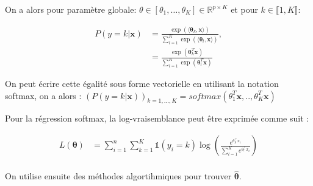 \documentclass{article}
\begin{document}
On a alors pour paramètre globale: \(\theta \in [\theta_1, \ldots, \theta_K] \in \mathbb{R}^{p\times K}\) et pour \(k \in \llbracket 1, K \rrbracket\):

\begin{align*}
    P(y=k | \bm{x}) &= \frac{\exp(\langle \boldsymbol{\theta}_k, \bm{x} \rangle)}{\sum_{l=1}^{K} \exp(\langle \boldsymbol{\theta}_l, \bm{x} \rangle)}, \\
    &= \frac{\exp(\boldsymbol{\theta}_k^T \bm{x})}{\sum_{l=1}^{K} \exp(\boldsymbol{\theta}_l^T \bm{x})}
\end{align*}


On peut écrire cette égalité sous forme vectorielle en utilisant la notation softmax, on a alors :
$(P(y=k | \bm{x}))_{k=1,...,K}=softmax(\theta_1^T\bm{x},..,\theta_K^T\bm{x})$

Pour la régression softmax, la log-vraisemblance peut être exprimée comme suit :

\begin{align*}
L(\bm{\theta}) &= \sum_{i=1}^{n} \sum_{k=1}^{K} \mathds{1}(y_i = k) \log\left(\frac{e^{\theta_k^\top x_i}}{\sum_{l=1}^{K} e^{\theta_l^\top x_i}}\right) \\
\end{align*}

On utilise ensuite des méthodes algortihmiques pour trouver    $\bm{\hat{\theta}}$.
\end{document}
